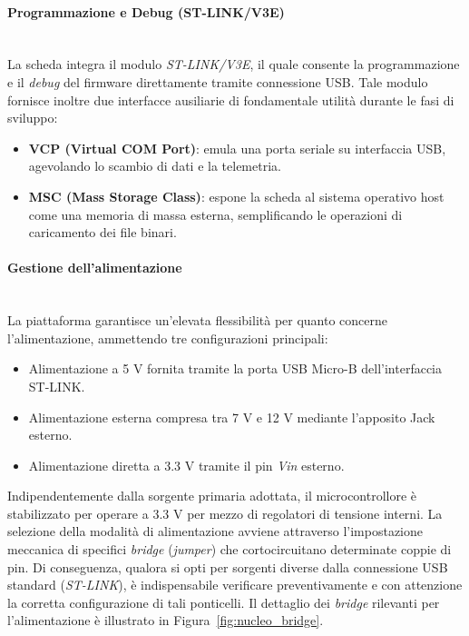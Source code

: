 \documentclass[11pt]{report}
\begin{document}
	\paragraph{Programmazione e Debug (ST-LINK/V3E)}\mbox{}\\
	La scheda integra il modulo \textit{ST-LINK/V3E}, il quale consente la programmazione e il \textit{debug} del firmware direttamente tramite connessione USB. Tale modulo fornisce inoltre due interfacce ausiliarie di fondamentale utilità durante le fasi di sviluppo:
	\begin{itemize}
		\item \textbf{VCP (Virtual COM Port)}: emula una porta seriale su interfaccia USB, agevolando lo scambio di dati e la telemetria.
		\item \textbf{MSC (Mass Storage Class)}: espone la scheda al sistema operativo host come una memoria di massa esterna, semplificando le operazioni di caricamento dei file binari.
	\end{itemize}
	
	\paragraph{Gestione dell'alimentazione}\mbox{}\\
	La piattaforma garantisce un'elevata flessibilità per quanto concerne l'alimentazione, ammettendo tre configurazioni principali:
	\begin{itemize}
		\item Alimentazione a 5 V fornita tramite la porta USB Micro-B dell'interfaccia ST-LINK.
		\item Alimentazione esterna compresa tra 7 V e 12 V mediante l'apposito Jack esterno.
		\item Alimentazione diretta a 3.3 V tramite il pin \textit{Vin} esterno.
	\end{itemize}
	Indipendentemente dalla sorgente primaria adottata, il microcontrollore è stabilizzato per operare a 3.3 V per mezzo di regolatori di tensione interni. La selezione della modalità di alimentazione avviene attraverso l'impostazione meccanica di specifici \textit{bridge} (\textit{jumper}) che cortocircuitano determinate coppie di pin. Di conseguenza, qualora si opti per sorgenti diverse dalla connessione USB standard (\textit{ST-LINK}), è indispensabile verificare preventivamente e con attenzione la corretta configurazione di tali ponticelli. Il dettaglio dei \textit{bridge} rilevanti per l'alimentazione è illustrato in Figura~\ref{fig:nucleo_bridge}.
	
\end{document}
